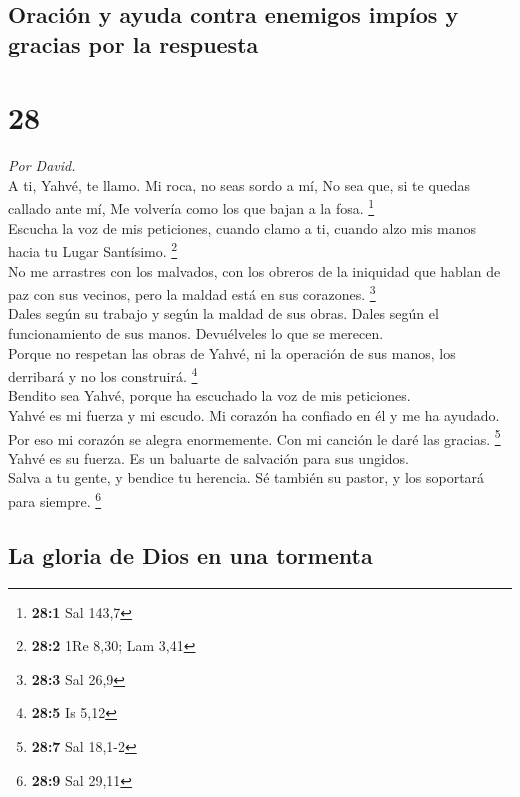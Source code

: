 \hypertarget{oraciuxf3n-y-ayuda-contra-enemigos-impuxedos-y-gracias-por-la-respuesta}{%
\subsection{Oración y ayuda contra enemigos impíos y gracias por la
respuesta}\label{oraciuxf3n-y-ayuda-contra-enemigos-impuxedos-y-gracias-por-la-respuesta}}

\hypertarget{section-27}{%
\section{28}\label{section-27}}

\emph{Por David.}\\
 A ti, Yahvé, te llamo. Mi roca, no seas sordo a mí, No
sea que, si te quedas callado ante mí, Me volvería como los que bajan a
la fosa. \footnote{\textbf{28:1} Sal 143,7}\\
 Escucha la voz de mis peticiones, cuando clamo a ti,
cuando alzo mis manos hacia tu Lugar Santísimo. \footnote{\textbf{28:2}
  1Re 8,30; Lam 3,41}\\
 No me arrastres con los malvados, con los obreros de la
iniquidad que hablan de paz con sus vecinos, pero la maldad está en sus
corazones. \footnote{\textbf{28:3} Sal 26,9}\\
 Dales según su trabajo y según la maldad de sus obras.
Dales según el funcionamiento de sus manos. Devuélveles lo que se
merecen.\\
 Porque no respetan las obras de Yahvé, ni la operación de
sus manos, los derribará y no los construirá. \footnote{\textbf{28:5} Is
  5,12}\\
 Bendito sea Yahvé, porque ha escuchado la voz de mis
peticiones.\\
 Yahvé es mi fuerza y mi escudo. Mi corazón ha confiado en
él y me ha ayudado. Por eso mi corazón se alegra enormemente. Con mi
canción le daré las gracias. \footnote{\textbf{28:7} Sal 18,1-2}\\
 Yahvé es su fuerza. Es un baluarte de salvación para sus
ungidos.\\
 Salva a tu gente, y bendice tu herencia. Sé también su
pastor, y los soportará para siempre. \footnote{\textbf{28:9} Sal 29,11}

\hypertarget{la-gloria-de-dios-en-una-tormenta}{%
\subsection{La gloria de Dios en una
tormenta}\label{la-gloria-de-dios-en-una-tormenta}}

